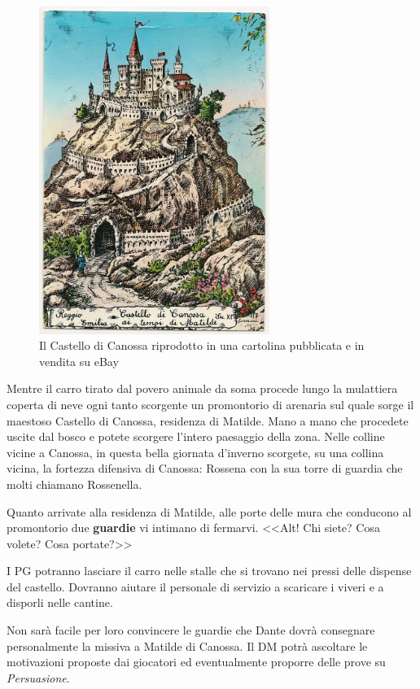 \documentclass[letterpaper,twocolumn,openany,nodeprecatedcode]{dndbook}
\begin{document}
\begin{figure}
\centering
\includegraphics[width=7.5cm]{img/castello.png}
\caption{Il Castello di Canossa riprodotto in una cartolina pubblicata e in vendita su eBay}
\label{castello}
\end{figure}


\begin{DndReadAloud}
Mentre il carro tirato dal povero animale da soma procede lungo la mulattiera coperta di neve ogni tanto scorgente un promontorio di arenaria sul quale sorge il maestoso Castello di Canossa, residenza di Matilde. Mano a mano che procedete uscite dal bosco e potete scorgere l'intero paesaggio della zona. Nelle colline vicine a Canossa, in questa bella giornata d'inverno scorgete, su una collina vicina, la fortezza difensiva di Canossa: Rossena con la sua torre di guardia che molti chiamano Rossenella.

Quanto arrivate alla residenza di Matilde, alle porte delle mura che conducono al promontorio due \textbf{guardie} vi intimano di fermarvi. <<Alt! Chi siete? Cosa volete? Cosa portate?>>
\end{DndReadAloud}

I PG potranno lasciare il carro nelle stalle che si trovano nei pressi delle dispense del castello. Dovranno aiutare il personale di servizio a scaricare i viveri e a disporli nelle cantine.

Non sarà facile per loro convincere le guardie che Dante dovrà consegnare personalmente la missiva a Matilde di Canossa. Il DM potrà ascoltare le motivazioni proposte dai giocatori ed eventualmente proporre delle prove su \textit{Persuasione}.
\end{document}

